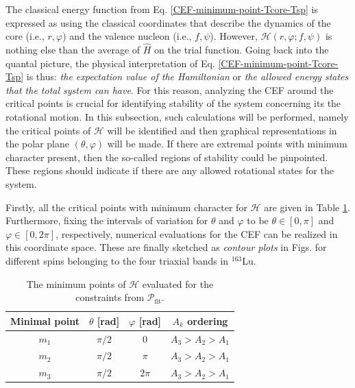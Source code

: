 The classical energy function from Eq. \ref{CEF-minimum-point-Tcore-Tsp} is expressed as using the classical coordinates that describe the dynamics of the core (i.e., $r,\varphi$) and the valence nucleon (i.e., $f,\psi$). However, $\mathcal{H}(r,\varphi;f,\psi)$ is nothing else than the average of $\hat{H}$ on the trial function. Going back into the quantal picture, the physical interpretation of Eq. \ref{CEF-minimum-point-Tcore-Tsp} is thus: \emph{the expectation value of the Hamiltonian} or \emph{the allowed energy states that the total system can have}. For this reason, analyzing the CEF around the critical points is crucial for identifying stability of the system concerning its the rotational motion. In this subsection, such calculations will be performed, namely the critical points of $\mathcal{H}$ will be identified and then graphical representations in the polar plane $(\theta,\varphi)$ will be made. If there are extremal points with minimum character present, then the so-called regions of stability could be pinpointed. These regions should indicate if there are any allowed rotational states for the system.

Firstly, all the critical points with minimum character for $\mathcal{H}$ are given in Table \ref{critical_points_h}. Furthermore, fixing the intervals of variation for $\theta$ and $\varphi$ to be $\theta\in[0,\pi]$ and $\varphi\in[0,2\pi]$, respectively, numerical evaluations for the CEF can be realized in this coordinate space. These are finally sketched as \emph{contour plots} in Figs. for different spins belonging to the four triaxial bands in $^{163}$Lu.
\begin{table}
    \centering
    \begin{tabular}{cccc}
    \hline
    Minimal point & $\theta$ [rad] & $\varphi$ [rad] & $A_k$ ordering \\
    \hline
    \hline
    $m_1$ & $\pi/2$ &   $0$     &   $A_3>A_2>A_1$   \\
    $m_2$ & $\pi/2$ &   $\pi$   &   $A_3>A_2>A_1$   \\
    $m_3$ & $\pi/2$ &   $2\pi$  &   $A_3>A_2>A_1$   \\
    \hline
    \end{tabular}
    \caption{The minimum points of $\mathcal{H}$ evaluated for the constraints from $\mathcal{P}_\text{fit}$.}
    \label{critical_points_h}
\end{table}